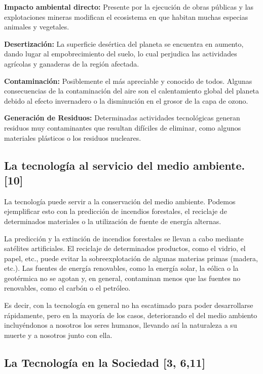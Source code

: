 \documentclass{bmcart}
\begin{document}
\textbf{Impacto ambiental directo:} 
Presente por la ejecución de obras públicas y las explotaciones mineras modifican el ecosistema en que habitan muchas especias animales y vegetales.\smallskip

\textbf{Desertización:} 
La superficie desértica del planeta se encuentra en aumento, dando lugar al empobrecimiento del suelo, lo cual perjudica las actividades agrícolas y ganaderas de la región afectada.\smallskip

\textbf{Contaminación:}
Posiblemente el más apreciable y conocido de todos. Algunas consecuencias de la contaminación del aire son el calentamiento global del planeta debido al efecto invernadero o la disminución en el grosor de la capa de ozono.\smallskip

\textbf{Generación de Residuos:}
Determinadas actividades tecnológicas generan residuos muy contaminantes que resultan difíciles de eliminar, como algunos materiales plásticos o los residuos nucleares.\smallskip
 
 \subsection*{La tecnología al servicio del medio ambiente. [10]}
 
La tecnología puede servir a la conservación del medio ambiente. Podemos ejemplificar esto con la predicción de incendios forestales, el reciclaje de determinados materiales o la utilización de fuente de energía alternas.\smallskip

La predicción y la extinción de incendios forestales se llevan a cabo mediante satélites artificiales. El reciclaje de determinados productos, como el vidrio, el papel, etc., puede evitar la sobreexplotación de algunas materias primas (madera, etc.). Las fuentes de energía renovables, como la energía solar, la eólica o la geotérmica no se agotan y, en general, contaminan menos que las fuentes no renovables, como el carbón o el petróleo.\smallskip

Es decir, con la tecnología en general no ha escatimado para poder desarrollarse rápidamente, pero en la mayoría de los casos, deteriorando el del medio ambiento incluyéndonos a nosotros los seres humanos, llevando así la naturaleza a su muerte y a nosotros junto con ella.\smallskip

\subsection*{La Tecnología en la Sociedad [3, 6,11]}
\smallskip
\end{document}
